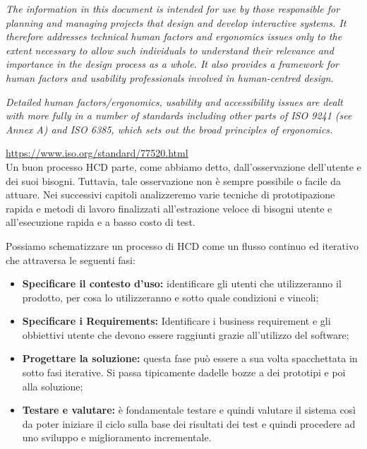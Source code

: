 \textit{The information in this document is intended for use by those responsible for planning and managing projects that design and develop interactive systems. It therefore addresses technical human factors and ergonomics issues only to the extent necessary to allow such individuals to understand their relevance and importance in the design process as a whole. It also provides a framework for human factors and usability professionals involved in human-centred design.}

\textit{Detailed human factors/ergonomics, usability and accessibility issues are dealt with more fully in a number of standards including other parts of ISO 9241 (see Annex A) and ISO 6385, which sets out the broad principles of ergonomics.}

\url{https://www.iso.org/standard/77520.html}\\

Un buon processo HCD parte, come abbiamo detto, dall'osservazione dell'utente e dei suoi bisogni. Tuttavia, tale osservazione non è sempre possibile o facile da attuare. Nei successivi capitoli analizzeremo varie tecniche di prototipazione rapida e metodi di lavoro finalizzati all'estrazione veloce di bisogni utente e all'esecuzione rapida e a basso costo di test. 

Possiamo schematizzare un processo di HCD come un flusso continuo ed iterativo che attraversa le seguenti fasi: 
\begin{itemize}
    \item \textbf{Specificare il contesto d'uso:} identificare gli utenti che utilizzeranno il prodotto, per cosa lo utilizzeranno e sotto quale condizioni e vincoli;
    \item \textbf{Specificare i Requirements:} Identificare i business requirement e gli obbiettivi utente che devono essere raggiunti grazie all'utilizzo del software;
    \item \textbf{Progettare la soluzione:} questa fase può essere a sua volta spacchettata in sotto fasi iterative. Si passa tipicamente dadelle bozze a dei prototipi e poi alla soluzione;
    \item \textbf{Testare e valutare:} è fondamentale testare e quindi valutare il sistema così da poter iniziare il ciclo sulla base dei risultati dei test e quindi procedere ad uno sviluppo e miglioramento incrementale.
\end{itemize}

